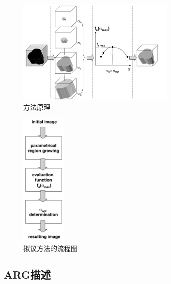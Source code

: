 \begin{figure}[htbp]
    \centering
    \includegraphics[width=0.7\textwidth]{figures/方法原理.png}
    \caption{方法原理}
    \label{fig:方法原理}
\end{figure}

\begin{figure}[htbp]
    \centering
    \includegraphics[width=0.2\textwidth]{figures/流程图.png}
    \caption{拟议方法的流程图}
    \label{fig:流程图}
\end{figure}

\subsection{ARG描述}\label{sec:arg_description}

